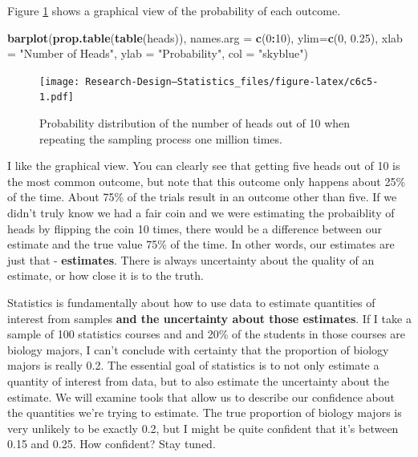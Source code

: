 \documentclass[
]{book}
\newenvironment{Shaded}{\begin{snugshade}}{\end{snugshade}}
\newcommand{\AttributeTok}[1]{\textcolor[rgb]{0.13,0.29,0.53}{#1}}
\newcommand{\DecValTok}[1]{\textcolor[rgb]{0.00,0.00,0.81}{#1}}
\newcommand{\FloatTok}[1]{\textcolor[rgb]{0.00,0.00,0.81}{#1}}
\newcommand{\FunctionTok}[1]{\textcolor[rgb]{0.13,0.29,0.53}{\textbf{#1}}}
\newcommand{\NormalTok}[1]{#1}
\newcommand{\SpecialCharTok}[1]{\textcolor[rgb]{0.81,0.36,0.00}{\textbf{#1}}}
\newcommand{\StringTok}[1]{\textcolor[rgb]{0.31,0.60,0.02}{#1}}
\begin{document}
Figure \ref{fig:c6c5} shows a graphical view of the probability of each outcome.

\begin{Shaded}
\begin{Highlighting}[]
\FunctionTok{barplot}\NormalTok{(}\FunctionTok{prop.table}\NormalTok{(}\FunctionTok{table}\NormalTok{(heads)),}
        \AttributeTok{names.arg =} \FunctionTok{c}\NormalTok{(}\DecValTok{0}\SpecialCharTok{:}\DecValTok{10}\NormalTok{),}
        \AttributeTok{ylim=}\FunctionTok{c}\NormalTok{(}\DecValTok{0}\NormalTok{, }\FloatTok{0.25}\NormalTok{),}
        \AttributeTok{xlab =} \StringTok{"Number of Heads"}\NormalTok{, }\AttributeTok{ylab =} \StringTok{"Probability"}\NormalTok{,}
        \AttributeTok{col =} \StringTok{"skyblue"}\NormalTok{)}
\end{Highlighting}
\end{Shaded}

\begin{figure}
\centering
\texttt{[image: Research-Design---Statistics\_files/figure-latex/c6c5-1.pdf]}
\caption{\label{fig:c6c5}Probability distribution of the number of heads out of 10 when repeating the sampling process one million times.}
\end{figure}

I like the graphical view. You can clearly see that getting five heads out of 10 is the most common outcome, but note that this outcome only happens about 25\% of the time. About 75\% of the trials result in an outcome other than five. If we didn't truly know we had a fair coin and we were estimating the probaiblity of heads by flipping the coin 10 times, there would be a difference between our estimate and the true value 75\% of the time. In other words, our estimates are just that - \textbf{estimates}. There is always uncertainty about the quality of an estimate, or how close it is to the truth.

Statistics is fundamentally about how to use data to estimate quantities of interest from samples \textbf{and the uncertainty about those estimates}. If I take a sample of 100 statistics courses and and 20\% of the students in those courses are biology majors, I can't conclude with certainty that the proportion of biology majors is really 0.2. The essential goal of statistics is to not only estimate a quantity of interest from data, but to also estimate the uncertainty about the estimate. We will examine tools that allow us to describe our confidence about the quantities we're trying to estimate. The true proportion of biology majors is very unlikely to be exactly 0.2, but I might be quite confident that it's between 0.15 and 0.25. How confident? Stay tuned.
\end{document}
